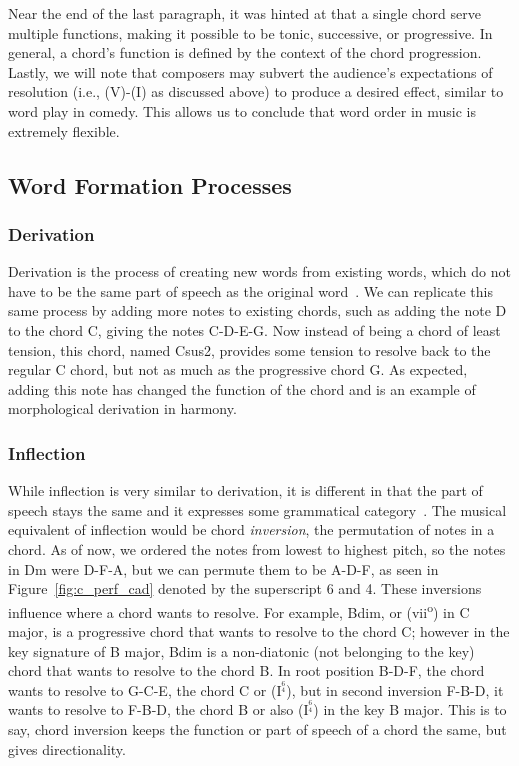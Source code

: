 \documentclass[12pt]{article}
\begin{document}
    Near the end of the last paragraph, it was hinted at that a single chord
    serve multiple functions, making it possible to be tonic, successive, or
    progressive. In general, a chord's function is defined by the context of
    the chord progression. Lastly, we will note that composers may subvert the
    audience's expectations of resolution (i.e., (V)-(I) as discussed above)
    to produce a desired effect, similar to word play in comedy. This allows
    us to conclude that word order in music is extremely flexible.
    \subsection*{Word Formation Processes}
    \subsubsection*{Derivation}
    Derivation is the process of creating new words from existing words, which
    do not have to be the same part of speech as the original 
    word~\autocite[p.~36]{jackson_stockwell_2011}. We can replicate this same
    process by adding more notes to existing chords, such as adding the note
    D to the chord C, giving the notes C-D-E-G\@. Now instead of being a chord
    of least tension, this chord, named Csus2, provides some tension to
    resolve back to the regular C chord, but not as much as the progressive
    chord G\@. As expected, adding this note has changed the function of the
    chord and is an example of morphological derivation in harmony.
    \subsubsection*{Inflection}
    While inflection is very similar to derivation, it is different in that
    the part of speech stays the same and it expresses some grammatical
    category~\autocite[p.~36]{jackson_stockwell_2011}. The musical equivalent
    of inflection would be chord \textit{inversion}, the permutation of notes
    in a chord. As of now, we ordered the notes from lowest to highest pitch,
    so the notes in Dm were D-F-A, but we can permute them to be A-D-F, as
    seen in Figure~\ref{fig:c_perf_cad} denoted by the superscript 6 and 4.
    These inversions influence where a chord wants to resolve. For example,
    Bdim, or (vii\textsuperscript{o}) in C major, is a progressive chord that
    wants to resolve to the chord C; however in the key signature of B\fl{}
    major, Bdim is a non-diatonic (not belonging to the key) chord that wants
    to resolve to the chord B\fl. In root position B-D-F, the chord wants to
    resolve to G-C-E, the chord C or ($\text{I}^{{}^6_4}$), but in second
    inversion F-B-D, it wants to resolve to F-B\fl-D, the chord B\fl{} or
    also ($\text{I}^{{}^6_4}$) in the key B\fl{} major. This is to say,
    chord inversion keeps the function or part of speech of a chord the same,
    but gives directionality.
\end{document}
